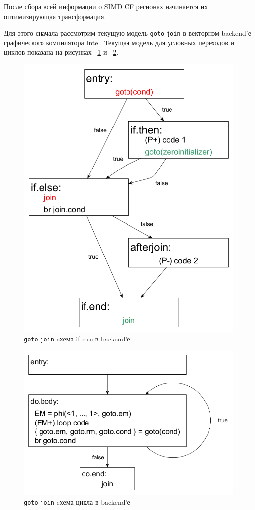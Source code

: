 После сбора всей информации о SIMD CF регионах начинается их оптимизирующая
трансформация.

Для этого сначала рассмотрим текущую модель \texttt{goto}-\texttt{join} в
векторном backend'е графического компилятора Intel. Текущая модель для условных
переходов и циклов показана на рисунках ~\ref{fig:if-goto-join-BE} и
~\ref{fig:loop-goto-join-BE}.
\begin{figure}
  \centering
  \includegraphics[scale=0.27]{Images/if-else-BE-current.png}
  \caption{\texttt{goto}-\texttt{join} cхема if-else в backend'е}
  \label{fig:if-goto-join-BE}
\end{figure}
\begin{figure}
  \centering
  \includegraphics[scale=0.27]{Images/do-while-BE-current.png}
  \caption{\texttt{goto}-\texttt{join} cхема цикла в backend'е}
  \label{fig:loop-goto-join-BE}
\end{figure}

